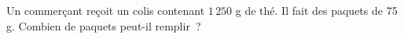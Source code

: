 \documentclass[exercice]{thedocument}%
\begin{document}
%
Un commerçant reçoit un colis contenant $1\,250$ g de thé. Il fait des paquets
de 75 g.\vskip5pt Combien de paquets peut-il remplir~?
\end{document}
